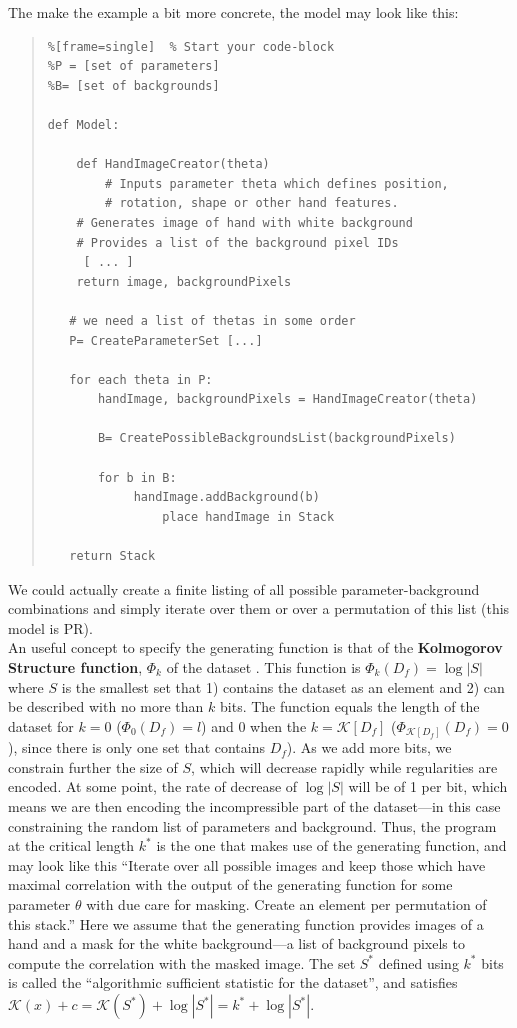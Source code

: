 \documentclass[11pt]{amsart}
\begin{document}
 The make the example a bit more concrete, the model may look like this: 
 \begin{quote}
 {\footnotesize
\begin{lstlisting}%[frame=single]  % Start your code-block
%P = [set of parameters]
%B= [set of backgrounds]

def Model:

    def HandImageCreator(theta)   
        # Inputs parameter theta which defines position, 
        # rotation, shape or other hand features.
	# Generates image of hand with white background
	# Provides a list of the background pixel IDs
	 [ ... ]
	return image, backgroundPixels 
   
   # we need a list of thetas in some order
   P= CreateParameterSet [...]
   
   for each theta in P: 
       handImage, backgroundPixels = HandImageCreator(theta)
       
       B= CreatePossibleBackgroundsList(backgroundPixels)
       
       for b in B:    	   
       		handImage.addBackground(b)		
            	place handImage in Stack
	
   return Stack
\end{lstlisting}
}
\end{quote}
We could actually create a finite listing of all possible parameter-background combinations and simply iterate over them or over a permutation of this list (this model is PR). \\ 

An useful concept to specify  the generating function is that of the {\bf Kolmogorov Structure function}, $\Phi_k$ of the dataset \cite{Cover:2006aa}.  This function is  $\Phi_k(D_{f})= \log |S|$ where $S$ is the smallest set that  1) contains the dataset as an element and 2) can be described with no more than $k$ bits.  The function equals the length of the dataset for $k=0$ ($\Phi_0(D_{f})=l$)  and 0 when the $k = \mathcal K [D_{f}]$ ($\Phi_{\mathcal K [D_{f}]}(D_{f})= 0$), since there is only one set that contains $D_{f}$). As we add more bits, we  constrain further the size of $S$, which will decrease rapidly while regularities are encoded. At some point, the rate of decrease of $\log |S|$ will be of 1 per bit, which means we are then encoding the incompressible part of the dataset---in this case constraining the random list of parameters and background. Thus, the program at the critical length $k^{*}$ \cite{Cover:2006aa}  is the one that makes use of the generating function, and may look like this ``Iterate over all possible images and keep those which have maximal correlation with the output of the generating function for some parameter $\theta$ with due care for masking. Create an element per permutation of this stack.'' Here we assume that the generating function provides images of a hand and a mask for the white background---a list of background pixels to compute the correlation with the masked image.  
The set $S^*$ defined using $k^{*}$ bits is called the ``algorithmic sufficient statistic for the dataset'', and satisfies $\mathcal K(x)+c=\mathcal K(S^{*})+\log |S^{*}| = k^{*}+\log |S^{*}|$. \\
\end{document}
